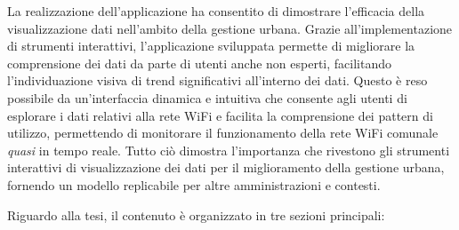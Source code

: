 La realizzazione dell'applicazione ha consentito di dimostrare l'efficacia della visualizzazione dati nell'ambito della gestione urbana. Grazie all'implementazione di strumenti interattivi, l'applicazione sviluppata permette di migliorare la comprensione dei dati da parte di utenti anche non esperti, facilitando l'individuazione visiva di trend significativi all'interno dei dati. Questo è reso possibile da un'interfaccia dinamica e intuitiva che consente agli utenti di esplorare i dati relativi alla rete WiFi e facilita la comprensione dei pattern di utilizzo, permettendo di monitorare il funzionamento della rete WiFi comunale \textit{quasi} in tempo reale. Tutto ciò dimostra l'importanza che rivestono gli strumenti interattivi di visualizzazione dei dati per il miglioramento della gestione urbana, fornendo un modello replicabile per altre amministrazioni e contesti.

Riguardo alla tesi, il contenuto è organizzato in tre sezioni principali:

